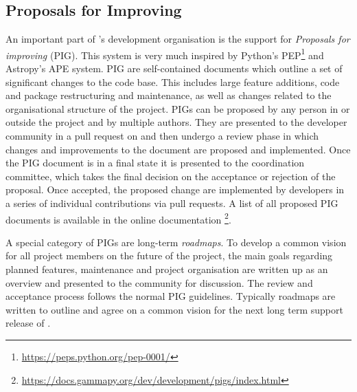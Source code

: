 \documentclass[longauth]{aa}
\begin{document}
\subsection{Proposals for Improving \gammapy}
\label{ssec:pigs}
An important part of \gammapy's development organisation is the support
for \textit{Proposals for improving \gammapy}(PIG). This system is very much
inspired by Python's PEP\footnote{\url{https://peps.python.org/pep-0001/}}
and Astropy's APE \citep{greenfield_perry_2013} system.
PIG are self-contained documents which outline a set of significant
changes to the \gammapy code base. This includes large feature additions,
code and package restructuring and maintenance, as well as changes related
to the organisational structure of the \gammapy project. PIGs can be proposed
by any person in or outside the project and by multiple authors. They
are presented to the \gammapy developer community in a pull request
on \github and then undergo a review phase in which changes and
improvements to the document are proposed and implemented. Once the PIG
document is in a final state it is presented to the \gammapy
coordination committee, which takes the final decision on the
acceptance or rejection of the proposal. Once accepted, the proposed
change are implemented by \gammapy developers in a series of
individual contributions via pull requests. A list of all proposed
PIG documents is available in the \gammapy online documentation
\footnote{\url{https://docs.gammapy.org/dev/development/pigs/index.html}}.

A special category of PIGs are long-term \textit{roadmaps}. To develop a common
vision for all \gammapy project members on the future of the
project, the main goals regarding planned features, maintenance and
project organisation are written up as an overview and presented to the
\gammapy community for discussion. The review and acceptance process
follows the normal PIG guidelines. Typically roadmaps are written
to outline and agree on a common vision for the next long term
support release of \gammapy.
\end{document}
